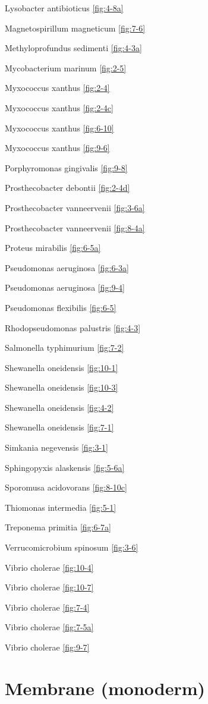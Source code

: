 \documentclass[]{tufte-book}
\begin{document}
Lysobacter antibioticus \ref{fig:4-8a}

Magnetospirillum magneticum \ref{fig:7-6}

Methyloprofundus sedimenti \ref{fig:4-3a}

Mycobacterium marinum \ref{fig:2-5}

Myxococcus xanthus \ref{fig:2-4}

Myxococcus xanthus \ref{fig:2-4c}

Myxococcus xanthus \ref{fig:6-10}

Myxococcus xanthus \ref{fig:9-6}

Porphyromonas gingivalis \ref{fig:9-8}

Prosthecobacter debontii \ref{fig:2-4d}

Prosthecobacter vanneervenii \ref{fig:3-6a}

Prosthecobacter vanneervenii \ref{fig:8-4a}

Proteus mirabilis \ref{fig:6-5a}

Pseudomonas aeruginosa \ref{fig:6-3a}

Pseudomonas aeruginosa \ref{fig:9-4}

Pseudomonas flexibilis \ref{fig:6-5}

Rhodopseudomonas palustris \ref{fig:4-3}

Salmonella typhimurium \ref{fig:7-2}

Shewanella oneidensis \ref{fig:10-1}

Shewanella oneidensis \ref{fig:10-3}

Shewanella oneidensis \ref{fig:4-2}

Shewanella oneidensis \ref{fig:7-1}

Simkania negevensis \ref{fig:3-1}

Sphingopyxis alaskensis \ref{fig:5-6a}

Sporomusa acidovorans \ref{fig:8-10c}

Thiomonas intermedia \ref{fig:5-1}

Treponema primitia \ref{fig:6-7a}

Verrucomicrobium spinosum \ref{fig:3-6}

Vibrio cholerae \ref{fig:10-4}

Vibrio cholerae \ref{fig:10-7}

Vibrio cholerae \ref{fig:7-4}

Vibrio cholerae \ref{fig:7-5a}

Vibrio cholerae \ref{fig:9-7}

\section*{Membrane (monoderm)}\label{membrane-monoderm}
\end{document}
